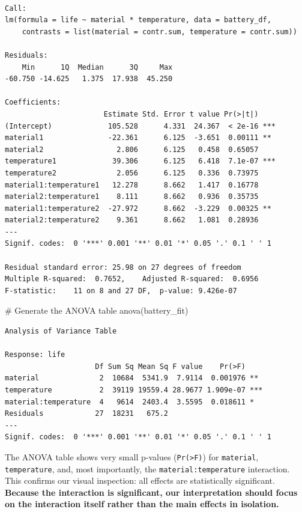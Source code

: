 \documentclass[
  letterpaper,
]{scrbook}
\newenvironment{Shaded}{\begin{snugshade}}{\end{snugshade}}
\newcommand{\CommentTok}[1]{\textcolor[rgb]{0.37,0.37,0.37}{#1}}
\newcommand{\FunctionTok}[1]{\textcolor[rgb]{0.28,0.35,0.67}{#1}}
\newcommand{\NormalTok}[1]{\textcolor[rgb]{0.00,0.23,0.31}{#1}}
\begin{document}
\begin{verbatim}

Call:
lm(formula = life ~ material * temperature, data = battery_df, 
    contrasts = list(material = contr.sum, temperature = contr.sum))

Residuals:
    Min      1Q  Median      3Q     Max 
-60.750 -14.625   1.375  17.938  45.250 

Coefficients:
                       Estimate Std. Error t value Pr(>|t|)    
(Intercept)             105.528      4.331  24.367  < 2e-16 ***
material1               -22.361      6.125  -3.651  0.00111 ** 
material2                 2.806      6.125   0.458  0.65057    
temperature1             39.306      6.125   6.418  7.1e-07 ***
temperature2              2.056      6.125   0.336  0.73975    
material1:temperature1   12.278      8.662   1.417  0.16778    
material2:temperature1    8.111      8.662   0.936  0.35735    
material1:temperature2  -27.972      8.662  -3.229  0.00325 ** 
material2:temperature2    9.361      8.662   1.081  0.28936    
---
Signif. codes:  0 '***' 0.001 '**' 0.01 '*' 0.05 '.' 0.1 ' ' 1

Residual standard error: 25.98 on 27 degrees of freedom
Multiple R-squared:  0.7652,    Adjusted R-squared:  0.6956 
F-statistic:    11 on 8 and 27 DF,  p-value: 9.426e-07
\end{verbatim}

\begin{Shaded}
\begin{Highlighting}[]
\CommentTok{\# Generate the ANOVA table}
\FunctionTok{anova}\NormalTok{(battery\_fit)}
\end{Highlighting}
\end{Shaded}

\begin{verbatim}
Analysis of Variance Table

Response: life
                     Df Sum Sq Mean Sq F value    Pr(>F)    
material              2  10684  5341.9  7.9114  0.001976 ** 
temperature           2  39119 19559.4 28.9677 1.909e-07 ***
material:temperature  4   9614  2403.4  3.5595  0.018611 *  
Residuals            27  18231   675.2                      
---
Signif. codes:  0 '***' 0.001 '**' 0.01 '*' 0.05 '.' 0.1 ' ' 1
\end{verbatim}

The ANOVA table shows very small p-values (\texttt{Pr(\textgreater{}F)})
for \texttt{material}, \texttt{temperature}, and, most importantly, the
\texttt{material:temperature} interaction. This confirms our visual
inspection: all effects are statistically significant. \textbf{Because
the interaction is significant, our interpretation should focus on the
interaction itself rather than the main effects in isolation.}
\end{document}
